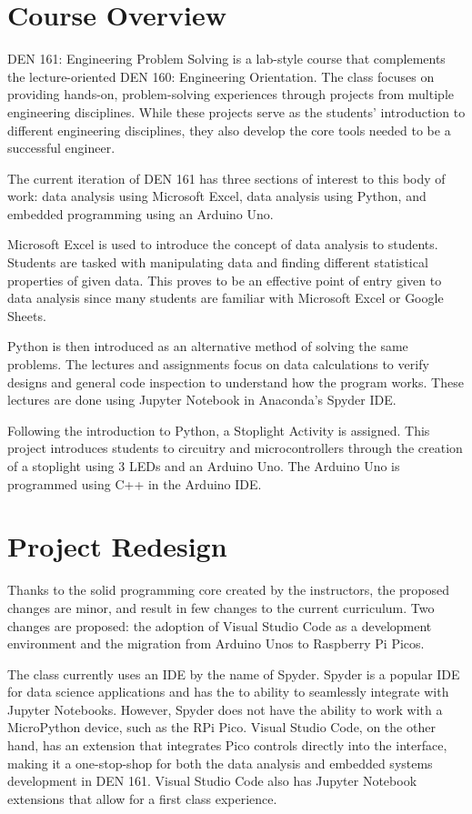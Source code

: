 \section{Course Overview}

DEN 161: Engineering Problem Solving is a lab-style course that complements the lecture-oriented DEN 160: 
Engineering Orientation. The class focuses on providing hands-on, problem-solving experiences through projects 
from multiple engineering disciplines. While these projects serve as the students' introduction to different 
engineering disciplines, they also develop the core tools needed to be a successful engineer. 

The current iteration of DEN 161 has three sections of interest to this body of work: data analysis using 
Microsoft Excel, data analysis using Python, and embedded programming using an Arduino Uno.

Microsoft Excel is used to introduce the concept of data analysis to students. Students are tasked with 
manipulating data and finding different statistical properties of given data. This proves to be an effective 
point of entry given to data analysis since many students are familiar with Microsoft Excel or Google Sheets.

Python is then introduced as an alternative method of solving the same problems. The lectures and assignments 
focus on data calculations to verify designs and general code inspection to understand how the program works. 
These lectures are done using Jupyter Notebook in Anaconda's Spyder IDE. 

Following the introduction to Python, a Stoplight Activity is assigned. This project introduces students to 
circuitry and microcontrollers through the creation of a stoplight using 3 LEDs and an Arduino Uno. The Arduino 
Uno is programmed using C++ in the Arduino IDE.

\section{Project Redesign}

Thanks to the solid programming core created by the instructors, the proposed changes are minor, and result in 
few changes to the current curriculum. Two changes are proposed: the adoption of Visual Studio Code as a 
development environment and the migration from Arduino Unos to Raspberry Pi Picos. 

The class currently uses an IDE by the name of Spyder. Spyder is a popular IDE for data science applications and 
has the to ability to seamlessly integrate with Jupyter Notebooks. However, Spyder does not have the ability to work 
with a MicroPython device, such as the RPi Pico. Visual Studio Code, on the other hand, has an extension that 
integrates Pico controls directly into the interface, making it a one-stop-shop for both the data analysis and 
embedded systems development in DEN 161. Visual Studio Code also has Jupyter Notebook extensions that allow for 
a first class experience.

